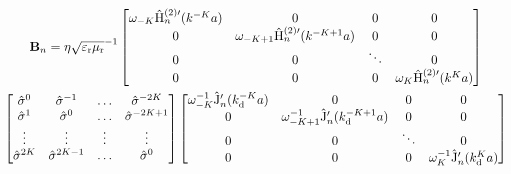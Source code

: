 
\begin{figure*}
\setcounter{tempEQCounter}{\value{equation}}
\setcounter{equation}{41}
\begin{multline}
    \mathbf{B}_n = \eta \sqrt{\varepsilon_{\mathrm{r}}\mu_{\mathrm{r}}}^{-1} 
    \begin{bmatrix}
    \omega_{-K}\hat{\mathrm{H}}^{(2)\prime}_n(k^{-K}a) & 0 & 0 & 0 \\
    0 & \omega_{-K+1}\hat{\mathrm{H}}^{(2)\prime}_n(k^{-K+1}a) & 0 & 0\\
    0 & 0 & \ddots & 0\\
    0 & 0 & 0 & \omega_{K}\hat{\mathrm{H}}^{(2)\prime}_n(k^{K}a)
    \end{bmatrix}\\
\begin{bmatrix}
    \hat{\sigma}^{0} &  \hat{\sigma}^{-1} & \hdots & \hat{\sigma}^{-2K} \\
    \hat{\sigma}^{1} &  \hat{\sigma}^0 & \hdots & \hat{\sigma}^{-2K+1} \\
    \vdots & \vdots & \vdots & \vdots\\
    \hat{\sigma}^{2K} &  \hat{\sigma}^{2K-1} & \hdots & \hat{\sigma}^0 \\
    \end{bmatrix}
    \begin{bmatrix}
    \omega^{-1}_{-K}\hat{\mathrm{J}}_n'(k^{-K}_{\mathrm{d}}a) & 0 & 0 & 0 \\
    0 & \omega_{-K+1}^{-1}\hat{\mathrm{J}}_n'(k^{-K+1}_{\mathrm{d}}a) & 0 & 0\\
    0 & 0 & \ddots & 0\\
    0 & 0 & 0 & \omega_{K}^{-1}\hat{\mathrm{J}}_n'(k^{K}_{\mathrm{d}}a)
    \end{bmatrix}
    \label{eq:bmatrix-long}
\end{multline}
\setcounter{equation}{\value{tempEQCounter}}
\end{figure*}

